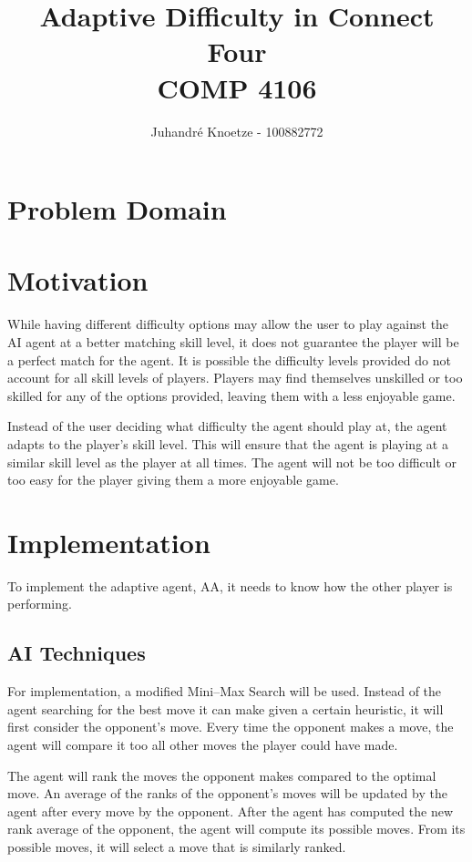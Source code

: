 \documentclass[12pt]{article}
\title{
    \vfill
    Adaptive Difficulty in Connect Four \\
    COMP 4106
}
\author{
    Juhandr\'{e} Knoetze - 100882772
}
\begin{document}
\begin{titlepage}
    \maketitle
    \vfill
    \thispagestyle{empty}
\end{titlepage}

\section*{Problem Domain}


\section*{Motivation}
While having different difficulty options may allow the user to play against the AI agent at a better matching skill level, it does not guarantee the player will be a perfect match for the agent. It is possible the difficulty levels provided do not account for all skill levels of players. Players may find themselves unskilled or too skilled for any of the options provided, leaving them with a less enjoyable game.

Instead of the user deciding what difficulty the agent should play at, the agent adapts to the player's skill level. This will ensure that the agent is playing at a similar skill level as the player at all times. The agent will not be too difficult or too easy for the player giving them a more enjoyable game.

\section*{Implementation}
To implement the adaptive agent, AA, it needs to know how the other player is performing. 
\subsection*{AI Techniques}
For implementation, a modified Mini--Max Search will be used. Instead of the agent searching for the best move it can make given a certain heuristic, it will first consider the opponent's move. Every time the opponent makes a move, the agent will compare it too all other moves the player could have made.

The agent will rank the moves the opponent makes compared to the optimal move. An average of the ranks of the opponent's moves will be updated by the agent after every move by the opponent. After the agent has computed the new rank average of the opponent, the agent will compute its possible moves. From its possible moves, it will select a move that is similarly ranked.
\end{document}
